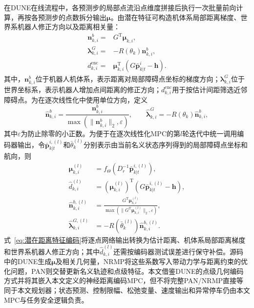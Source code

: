 在DUNE在线流程中，各预测步的局部点流沿点维度拼接后执行一次批量前向计算，再按各预测步的点数拆分输出$\boldsymbol{\mu}$。由潜在特征可构造机体系局部距离梯度、世界系机器人修正方向以及距离相关量：
\begin{align}
    \mathbf{n}_{k,i}^{b}
    ={}&G^{\mathrm T}\boldsymbol{\mu}_{k,i},
    \label{eq:编码器局部距离梯度}\\
    \boldsymbol{\lambda}_{k,i}^{G}
    ={}&-R(\theta_k)\mathbf{n}_{k,i}^{b},
    \label{eq:神经编码器分离方向}\\
    d_{k,i}^{\mathrm{enc}}
    ={}&\boldsymbol{\mu}_{k,i}^{\mathrm T}
    \left(G\bar{\mathbf{p}}_{k|t}^{i}-\mathbf h\right).
    \label{eq:神经编码器距离}
\end{align}
其中，$\mathbf{n}_{k,i}^{b}$位于机器人机体系，表示距离对局部障碍点坐标的梯度方向；$\boldsymbol{\lambda}_{k,i}^{G}$位于世界坐标系，表示机器人增加点间距离的修正方向；$d_{k,i}^{\mathrm{enc}}$用于按估计间距筛选近邻障碍点。为在逐次线性化中使用单位方向，定义
\begin{equation}
    \hat{\mathbf n}_{k,i}^{b}
    =\frac{\mathbf n_{k,i}^{b}}
    {\max(\|\mathbf n_{k,i}^{b}\|_2,\varepsilon)},
    \qquad
    \hat{\boldsymbol\lambda}_{k,i}^{G}
    =-R(\theta_k)\hat{\mathbf n}_{k,i}^{b},
    \label{eq:编码器分离方向归一化}
\end{equation}
其中$\varepsilon$为防止除零的小正数。为便于在逐次线性化MPC的第$l$轮迭代中统一调用编码器输出，令$\bar{\mathbf p}_{k|t}^{i,(l)}$和$\bar\theta_k^{(l)}$分别表示由当前名义状态序列得到的局部障碍点坐标和航向，则
\begin{equation}
    \begin{aligned}
        \boldsymbol{\mu}_{k,i}^{(l)}
        &=f_{\Theta}\!\left(D_r^{-1}\bar{\mathbf p}_{k|t}^{i,(l)}\right),\\
        \hat d_{k,i}^{(l)}
        &=(\boldsymbol{\mu}_{k,i}^{(l)})^{\mathrm T}
        \left(G\bar{\mathbf p}_{k|t}^{i,(l)}-\mathbf h\right),\\
        \hat{\mathbf n}_{k,i}^{b,(l)}
        &=\frac{G^{\mathrm T}\boldsymbol{\mu}_{k,i}^{(l)}}
        {\max(\|G^{\mathrm T}\boldsymbol{\mu}_{k,i}^{(l)}\|_2,\varepsilon)},\\
        \hat{\boldsymbol\lambda}_{k,i}^{G,(l)}
        &=-R(\bar\theta_k^{(l)})\hat{\mathbf n}_{k,i}^{b,(l)}.
    \end{aligned}
    \label{eq:潜在距离特征编码}
\end{equation}
式~\eqref{eq:潜在距离特征编码}将逐点网络输出转换为估计距离、机体系局部距离梯度和世界系机器人修正方向；其中$\hat d_{k,i}^{(l)}$还需按编码器测试误差进行保守补偿。源码中的DUNE生成$\boldsymbol\mu$及相关几何量，NRMP将这些系数写入带动力学与距离约束的优化问题，PAN则交替更新名义轨迹和点级特征。本文借鉴DUNE的点级几何编码方式并将其嵌入本文定义的神经距离编码MPC，但不将完整PAN/NRMP直接等同于本文规划器；状态预测、控制限幅、松弛变量、速度输出和异常停车仍由本文MPC与任务安全逻辑负责。

